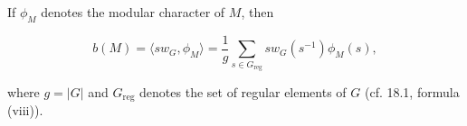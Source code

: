 If $\phi_M$ denotes the modular character of $M$, then

$$b(M) = \langle sw_G, \phi_M \rangle = \frac{1}{g} \sum_{s \in G_{\text{reg}}} sw_G(s^{-1}) \phi_M(s),$$

where $g = |G|$ and $G_{\text{reg}}$ denotes the set of regular elements of $G$ (cf. 18.1, formula (viii)).
